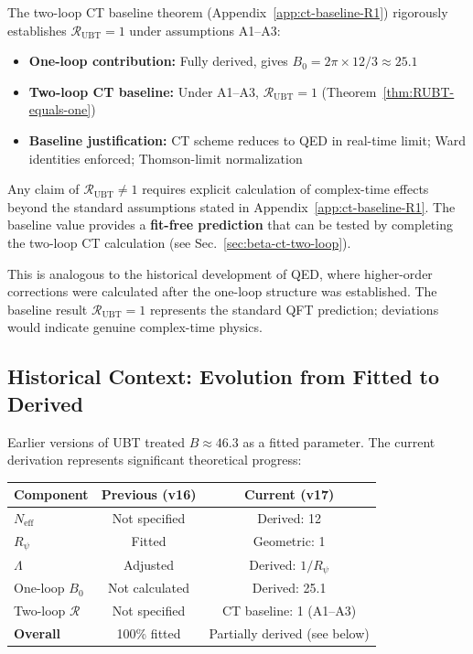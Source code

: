 \documentclass[11pt,a4paper]{article}
\theoremstyle{remark}
\begin{document}
The two-loop CT baseline theorem (Appendix~\ref{app:ct-baseline-R1}) rigorously establishes $\mathcal{R}_{\text{UBT}} = 1$ under assumptions A1--A3:

\begin{itemize}
\item \textbf{One-loop contribution:} Fully derived, gives $B_0 = 2\pi \times 12 / 3 \approx 25.1$
\item \textbf{Two-loop CT baseline:} Under A1--A3, $\mathcal{R}_{\text{UBT}} = 1$ (Theorem~\ref{thm:RUBT-equals-one})
\item \textbf{Baseline justification:} CT scheme reduces to QED in real-time limit; Ward identities enforced; Thomson-limit normalization
\end{itemize}

Any claim of $\mathcal{R}_{\text{UBT}} \neq 1$ requires explicit calculation of complex-time effects beyond the standard assumptions stated in Appendix~\ref{app:ct-baseline-R1}. The baseline value provides a \textbf{fit-free prediction} that can be tested by completing the two-loop CT calculation (see Sec.~\ref{sec:beta-ct-two-loop}).

This is analogous to the historical development of QED, where higher-order corrections were calculated after the one-loop structure was established. The baseline result $\mathcal{R}_{\text{UBT}} = 1$ represents the standard QFT prediction; deviations would indicate genuine complex-time physics.

\subsection{Historical Context: Evolution from Fitted to Derived}

Earlier versions of UBT treated $B \approx 46.3$ as a fitted parameter. The current derivation represents significant theoretical progress:

\begin{center}
\begin{tabular}{|l|c|c|}
\hline
\textbf{Component} & \textbf{Previous (v16)} & \textbf{Current (v17)} \\
\hline
$N_{\text{eff}}$ & Not specified & Derived: 12 \\
$R_\psi$ & Fitted & Geometric: 1 \\
$\Lambda$ & Adjusted & Derived: $1/R_\psi$ \\
One-loop $B_0$ & Not calculated & Derived: 25.1 \\
Two-loop $\mathcal{R}$ & Not specified & CT baseline: 1 (A1--A3) \\
\hline
\textbf{Overall} & 100\% fitted & Partially derived (see below) \\
\hline
\end{tabular}
\end{center}
\end{document}
